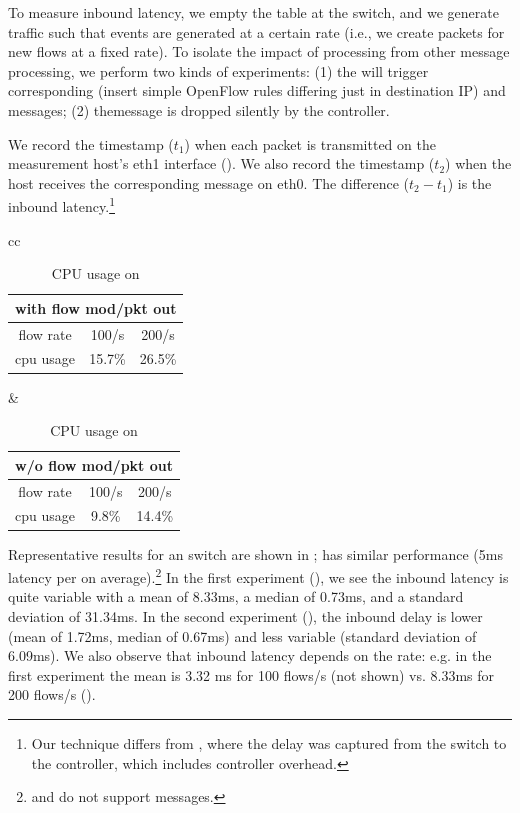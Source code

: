 To measure inbound latency, we empty the table at the switch, and we generate
traffic such that \packetin events are generated at a certain rate (i.e., we
create packets for new flows at a fixed rate). To isolate the impact of
\packetin processing from other message processing, we perform two kinds of
experiments: (1) the \packetin will trigger corresponding \flowmod (insert
simple OpenFlow rules differing just in destination IP) and \packetout
messages; (2) the\linebreak \packetin message is dropped silently by the
controller. 

We record the timestamp ($t_1$) when each packet is transmitted on the
measurement host's eth1 interface (). We also record
the timestamp ($t_2$) when the host receives the corresponding \packetin
message on eth0. The difference ($t_2 - t_1$) is the inbound
latency.\footnote{Our technique differs from \cite{huang2013high}, where the
delay was captured from the switch to the controller, which includes
controller overhead.}


\begin{table}
\centering
\begin{scriptsize}
\begin{tabular}{cc}
\begin{tabular}{|c|c|c|}
\hline
\multicolumn{3}{|c|}{with flow mod/pkt out} \\ \hline
flow rate & 100/s  & 200/s  \\ \hline
cpu usage & 15.7\%    & 26.5\%   \\ \hline
\end{tabular}
&
\begin{tabular}{|c|c|c|}
\hline
\multicolumn{3}{|c|}{w/o flow mod/pkt out} \\ \hline
flow rate & 100/s   & 200/s \\ \hline
cpu usage & 9.8\%     & 14.4\%   \\ \hline
\end{tabular}
\end{tabular}
\caption{CPU usage on \Intel}
\label{fig:inbound-cpu}
\end{scriptsize}
\end{table} 

Representative results for an \Intel switch are shown in
;
\IBM has similar performance (5ms latency per \packetin on 
average).\footnote{\BroadcomOne and \BroadcomThree do not support \packetin
messages.} In the first experiment (), we see the inbound latency is quite
variable with a mean of 8.33ms, a median of 0.73ms, and a standard deviation
of 31.34ms. In the second experiment (), the inbound delay is lower (mean of 
1.72ms, median of 0.67ms) and less variable (standard deviation of 6.09ms). 
We also observe that inbound latency depends on the \packetin rate: e.g. in
the first experiment the mean is 3.32 ms for 100 flows/s (not shown) vs. 8.33ms
for 200 flows/s ().

